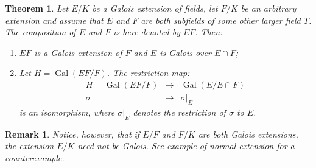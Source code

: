\documentclass[12pt]{article}
\newtheorem{thm}{Theorem}
\newtheorem{rem}{Remark}
\newcommand{\Gal}{\operatorname{Gal}}
\begin{document}
\begin{thm}
Let $E/K$ be a Galois extension of fields, let $F/K$ be an arbitrary extension and  assume that $E$ and $F$ are both subfields of some other larger field $T$. The compositum of $E$ and $F$ is here denoted by $EF$. Then:
\begin{enumerate}
\item $EF$ is a Galois extension of $F$ and $E$ is Galois over $E\cap F$;\\

\item Let $H=\Gal(EF/F)$. The restriction map:
\begin{eqnarray*}
H=\Gal(EF/F) & \longrightarrow & \Gal(E/E\cap F)\\
\sigma & \longrightarrow & \sigma |_{E}
\end{eqnarray*}
is an isomorphism, where $\sigma |_{E}$ denotes the restriction of $\sigma$ to $E$. 
\end{enumerate}
\end{thm}

\begin{rem}
Notice, however, that if $E/F$ and $F/K$ are both Galois extensions, the extension $E/K$ need not be Galois. See example of normal extension for a counterexample.
\end{rem}
\end{document}
